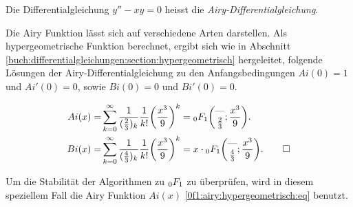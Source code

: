 \begin{definition}
    \label{0f1:airy:differentialgleichung:def}
    Die Differentialgleichung
    $y'' - xy = 0$
    heisst die {\em Airy-Differentialgleichung}.
\end{definition}

Die Airy Funktion lässt sich auf verschiedene Arten darstellen. 
Als hypergeometrische Funktion berechnet, ergibt sich wie in Abschnitt \ref{buch:differentialgleichungen:section:hypergeometrisch} hergeleitet, folgende Lösungen der Airy-Differentialgleichung zu den Anfangsbedingungen $Ai(0)=1$ und $Ai'(0)=0$, sowie $Bi(0)=0$ und $Bi'(0)=0$.

\begin{align}
\label{0f1:airy:hypergeometrisch:eq}
Ai(x)
=&
\sum_{k=0}^\infty
\frac{1}{(\frac23)_k} \frac{1}{k!}\biggl(\frac{x^3}{9}\biggr)^k
=
\mathstrut_0F_1\biggl(
\begin{matrix}\text{---}\\\frac23\end{matrix};\frac{x^3}{9}
\biggr).
\\
Bi(x)
=&
\sum_{k=0}^\infty
\frac{1}{(\frac43)_k} \frac{1}{k!}\biggl(\frac{x^3}{9}\biggr)^k
=
x\cdot\mathstrut_0F_1\biggl(
\begin{matrix}\text{---}\\\frac43\end{matrix};
\frac{x^3}{9}
\biggr).
\qedhere
\end{align}

Um die Stabilität der Algorithmen zu $\mathstrut_0F_1$ zu überprüfen, wird in diesem speziellem Fall die Airy Funktion $Ai(x)$ \eqref{0f1:airy:hypergeometrisch:eq}
benutzt.


